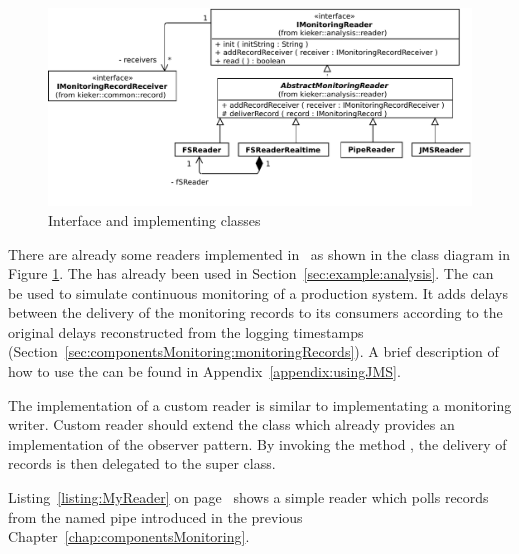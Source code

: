 \begin{figure}\centering
\includegraphics[scale=0.7]{images/kieker_readerimplsuserguide-modified}
\caption{Interface  and implementing classes}
\label{Figure:ReaderHierarchy}
\end{figure}
% 
% 


\noindent There are already some readers implemented in \Kieker\  as shown in the %
class diagram in Figure \ref{Figure:ReaderHierarchy}. %
The  has already been used in Section~\ref{sec:example:analysis}. %
The  can be used to simulate continuous monitoring of a %
production system. It adds delays between the delivery of the monitoring records %
to its consumers according to the original delays reconstructed from the logging %
timestamps (Section~\ref{sec:componentsMonitoring:monitoringRecords}).
A brief description of how to use the  can be found in Appendix~\ref{appendix:usingJMS}. %

\noindent The implementation of a custom reader is similar to implementating a %
monitoring writer. Custom reader should extend the class  %
which already provides an implementation of the observer pattern. %
By invoking the method ,  the delivery of records is then %
delegated to the super class.

Listing~\ref{listing:MyReader} on page~\pageref{listing:MyReader} shows a simple reader which polls records from %
the named pipe introduced in the previous Chapter~\ref{chap:componentsMonitoring}. %

